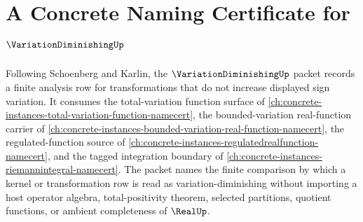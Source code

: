 \chapter{A Concrete Naming Certificate for $\VariationDiminishingUp$}
\label{ch:concrete-instances-variation-diminishing-namecert}

Following Schoenberg and Karlin, the $\VariationDiminishingUp$ packet records a finite analysis row for transformations that do not increase displayed sign variation. It consumes the total-variation function surface of \autoref{ch:concrete-instances-total-variation-function-namecert}, the bounded-variation real-function carrier of \autoref{ch:concrete-instances-bounded-variation-real-function-namecert}, the regulated-function source of \autoref{ch:concrete-instances-regulatedrealfunction-namecert}, and the tagged integration boundary of \autoref{ch:concrete-instances-riemannintegral-namecert}. The packet names the finite comparison by which a kernel or transformation row is read as variation-diminishing without importing a host operator algebra, total-positivity theorem, selected partitions, quotient functions, or ambient completeness of $\RealUp$.

